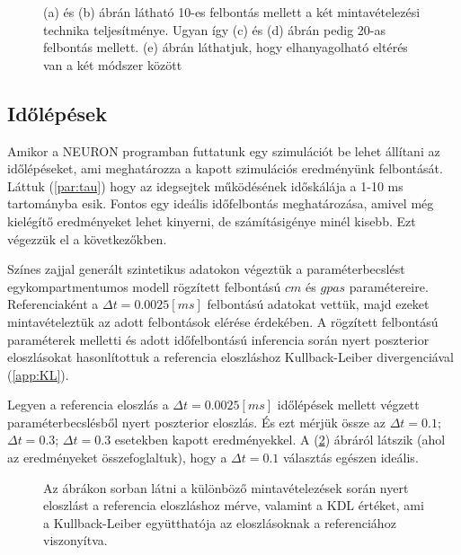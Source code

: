 \begin{figure}
	\hfill
	\hfill
	\hfill
	\vfill
	\hfill
	\vfill
	\centering
	\caption[Prior mintavételezés]{(a) és (b) ábrán látható 10-es felbontás mellett a két mintavételezési technika teljesítménye. Ugyan így (c) és (d) ábrán pedig 20-as felbontás mellett. (e) ábrán láthatjuk, hogy elhanyagolható eltérés van a két módszer között}%
	\label{fig:prior_samp}
\end{figure}

\FloatBarrier
\subsection{Időlépések}\label{app:timestep}
Amikor a NEURON programban futtatunk egy szimulációt be lehet állítani az időlépéseket, ami meghatározza a kapott szimulációs eredményünk felbontását. Láttuk (\ref{par:tau}) hogy az idegsejtek működésének időskálája a 1-10 ms tartományba esik. Fontos egy ideális időfelbontás meghatározása, amivel még kielégítő eredményeket lehet kinyerni, de számításigénye minél kisebb. Ezt végezzük el a következőkben. 

Színes zajjal generált szintetikus adatokon végeztük a paraméterbecslést egykompartmentumos modell rögzített felbontású $cm$ és $gpas$ paramétereire. Referenciaként a $\Delta t = 0.0025 [ms]$ felbontású adatokat vettük, majd ezeket mintavételeztük az adott felbontások elérése érdekében. A rögzített felbontású paraméterek melletti és adott időfelbontású inferencia során nyert poszterior eloszlásokat hasonlítottuk a referencia eloszláshoz Kullback-Leiber divergenciával (\ref{app:KL}).

Legyen a referencia eloszlás a $\Delta t = 0.0025 [ms]$ időlépések mellett végzett paraméterbecslésből nyert poszterior eloszlás. És ezt mérjük össze az $\Delta t = 0.1 $; $\Delta t = 0.3 $; $\Delta t = 0.3 $ esetekben kapott eredményekkel. A (\ref{fig:timestep}) ábráról látszik (ahol az eredményeket összefoglaltuk), hogy a $\Delta t = 0.1 $ választás egészen ideális.

\begin{figure}
	\hfill
	\hfill
	\hfill
	\vfill
	\centering
	\caption[Időlépések megválasztása]{Az ábrákon sorban látni a különböző mintavételezések során nyert eloszlást a referencia eloszláshoz mérve, valamint a KDL értéket, ami a Kullback-Leiber együtthatója az eloszlásoknak a referenciához viszonyítva.}%
	\label{fig:timestep}
\end{figure}

\FloatBarrier